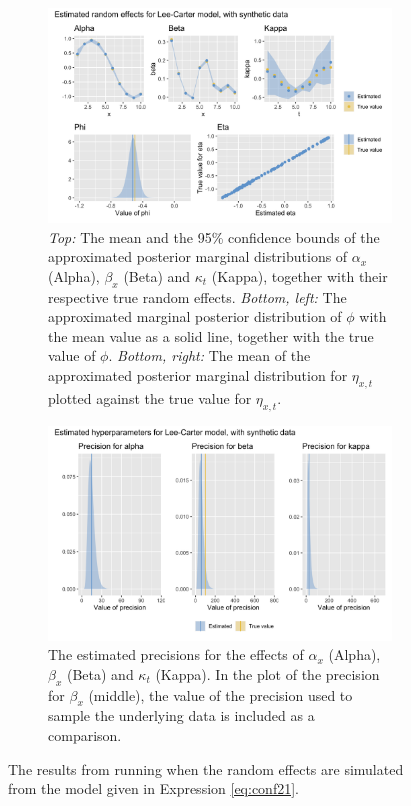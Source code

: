 \begin{figure}[h!]
    \centering
    \begin{subfigure}[b]{0.6\textwidth}
        \centering
        \includegraphics[width=\textwidth]{synthetic-data/Figures/effects-LC-synthetic.png}
        \caption{\textit{Top:} The mean and the 95\% confidence bounds of the approximated posterior marginal distributions of $\alpha_x$ (Alpha), $\beta_x$ (Beta) and $\kappa_t$ (Kappa), together with their respective true random effects. \textit{Bottom, left:} The approximated marginal posterior distribution of $\phi$ with the mean value as a solid line, together with the true value of $\phi$. \textit{Bottom, right:} The mean of the approximated posterior marginal distribution for $\eta_{x,t}$ plotted against the true value for $\eta_{x,t}$. }
        \label{fig:firstRun-top}
    \end{subfigure}
    
    \begin{subfigure}[b]{0.6\textwidth}
        \centering
        \includegraphics[width=0.85\linewidth]{synthetic-data/Figures/hyperparameters-LC-synthetic-2-1.png}
        \caption{The estimated precisions for the effects of $\alpha_x$ (Alpha), $\beta_x$ (Beta) and $\kappa_t$ (Kappa). In the plot of the precision for $\beta_x$ (middle), the value of the precision used to sample the underlying data is included as a comparison. }
        \label{fig:firstRun-bottom}
    \end{subfigure}
    
    \caption{The results from running \inlabru when the random effects are simulated from the model given in Expression \ref{eq:conf21}. }
    \label{fig:firstRun}
\end{figure}


